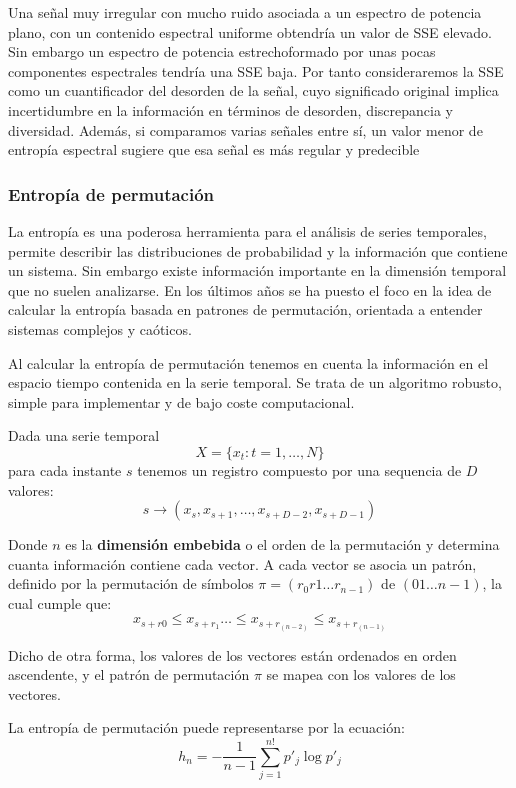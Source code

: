Una señal muy irregular con mucho ruido asociada a un espectro de potencia plano, con un contenido espectral uniforme obtendría un valor de SSE elevado. Sin embargo un espectro de potencia estrechoformado por unas pocas componentes espectrales tendría una SSE baja. Por tanto consideraremos la SSE como un cuantificador del desorden de la señal, cuyo significado original implica incertidumbre en la información en términos de desorden, discrepancia y diversidad. Además, si comparamos varias señales entre sí, un valor menor de entropía espectral sugiere que esa señal es más regular y predecible

\subsubsection{Entropía de permutación}

La entropía es una poderosa herramienta para el análisis de series temporales, permite describir las distribuciones de probabilidad y la información que contiene un sistema. Sin embargo existe información importante en la dimensión temporal que no suelen analizarse. En los últimos años se ha puesto el foco en la idea de calcular la entropía basada en patrones de permutación, orientada a entender sistemas complejos y caóticos.\cite{pe1}

Al calcular la entropía de permutación tenemos en cuenta la información en el espacio tiempo contenida en la serie temporal. Se trata de un algoritmo robusto, simple para implementar y de bajo coste computacional.

Dada una serie temporal $$ X= \{x_{t}:t=1,\dots,N\}$$ para cada instante $s$ tenemos un registro compuesto por una sequencia de $D$ valores: $$s \rightarrow (x_{s},x_{s+1},\dots,x_{s+D-2}, x_{s+D-1})$$\label{ecuaciones:1}

Donde $n$ es la \textbf{dimensión embebida} o el orden de la permutación y determina cuanta información contiene cada vector. A cada vector se asocia un patrón, definido por la permutación de símbolos $\pi=(r_{0}r{1} \dots r_{n-1})$ de $(01 \dots n-1)$, la cual cumple que:\cite{pe1} $$x_{s+r{0}} \leq x_{s+r_{1}} \dots \leq x_{s+r_{(n-2)}} \leq x_{s+r_{(n-1)}}$$

Dicho de otra forma, los valores de los vectores están ordenados en orden ascendente, y el patrón de permutación $\pi$ se mapea con los valores de los vectores.

La entropía de permutación puede representarse por la ecuación:
$$h_{n}=-\frac{1}{n-1}\sum_{j=1}^{n!}p'_{j}\log{p'_{j}}$$ \label{ecuaciones:3} 

